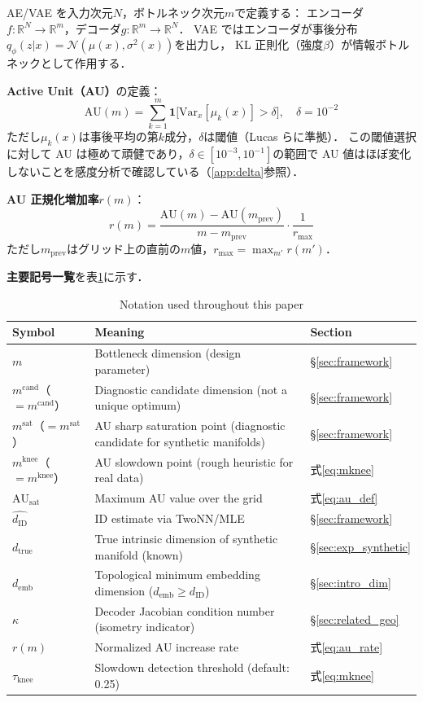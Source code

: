 \documentclass[11pt,a4paper]{jsarticle}
\newcommand{\dID}{d_{\mathrm{ID}}}
\newcommand{\dzopt}{m^{\mathrm{cand}}}
\newcommand{\dtrue}{d_{\mathrm{true}}}
\newcommand{\R}{\mathbb{R}}
\newcommand{\kap}{\kappa}
\newcommand{\AUsat}{\mathrm{AU}_{\mathrm{sat}}}
\newcommand{\dzsat}{m^{\mathrm{sat}}}
\newcommand{\mknee}{m^{\mathrm{knee}}}
\newcommand{\demb}{d_{\mathrm{emb}}}
\begin{document}
AE/VAE を入力次元$N$，ボトルネック次元$m$で定義する：
エンコーダ$f: \R^N \to \R^m$，デコーダ$g: \R^m \to \R^N$．
VAE ではエンコーダが事後分布$q_\phi(z|x) = \mathcal{N}(\mu(x), \sigma^2(x))$を出力し，
KL 正則化（強度$\beta$）が情報ボトルネックとして作用する．

\textbf{Active Unit（AU）}の定義：
\begin{equation}
  \mathrm{AU}(m) = \sum_{k=1}^{m} \mathbf{1}\bigl[\mathrm{Var}_x[\mu_k(x)] > \delta\bigr],
  \quad \delta = 10^{-2}
  \label{eq:au_def}
\end{equation}
ただし$\mu_k(x)$は事後平均の第$k$成分，$\delta$は閾値（Lucas ら\cite{lucas2019elbo}に準拠）．
この閾値選択に対して AU は極めて頑健であり，$\delta \in [10^{-3}, 10^{-1}]$の範囲で AU 値はほぼ変化しないことを感度分析で確認している（\ref{app:delta}参照）．

\textbf{AU 正規化増加率}$r(m)$：
\begin{equation}
  r(m) = \frac{\mathrm{AU}(m) - \mathrm{AU}(m_{\mathrm{prev}})}{m - m_{\mathrm{prev}}} \cdot \frac{1}{r_{\max}}
  \label{eq:au_rate}
\end{equation}
ただし$m_{\mathrm{prev}}$はグリッド上の直前の$m$値，$r_{\max} = \max_{m'} r(m')$．

\textbf{主要記号一覧}を表\ref{tab:notation}に示す．

\begin{table}[H]
\centering
\caption{Notation used throughout this paper}
\label{tab:notation}
\small
\begin{tabular}{lll}
\toprule
Symbol & Meaning & Section \\
\midrule
$m$ & Bottleneck dimension (design parameter) & §\ref{sec:framework} \\
$\dzopt$（$= m^{\mathrm{cand}}$） & Diagnostic candidate dimension (not a unique optimum) & §\ref{sec:framework} \\
$\dzsat$（$= m^{\mathrm{sat}}$） & AU sharp saturation point (diagnostic candidate for synthetic manifolds) & §\ref{sec:framework} \\
$\mknee$（$= m^{\mathrm{knee}}$） & AU slowdown point (rough heuristic for real data) & 式\eqref{eq:mknee} \\
$\AUsat$ & Maximum AU value over the grid & 式\eqref{eq:au_def} \\
$\hat{\dID}$ & ID estimate via TwoNN/MLE & §\ref{sec:framework} \\
$\dtrue$ & True intrinsic dimension of synthetic manifold (known) & §\ref{sec:exp_synthetic} \\
$\demb$ & Topological minimum embedding dimension ($\demb \geq \dID$) & §\ref{sec:intro_dim} \\
$\kap$ & Decoder Jacobian condition number (isometry indicator) & §\ref{sec:related_geo} \\
$r(m)$ & Normalized AU increase rate & 式\eqref{eq:au_rate} \\
$\tau_{\mathrm{knee}}$ & Slowdown detection threshold (default: 0.25) & 式\eqref{eq:mknee} \\
\bottomrule
\end{tabular}
\end{table}
\end{document}
